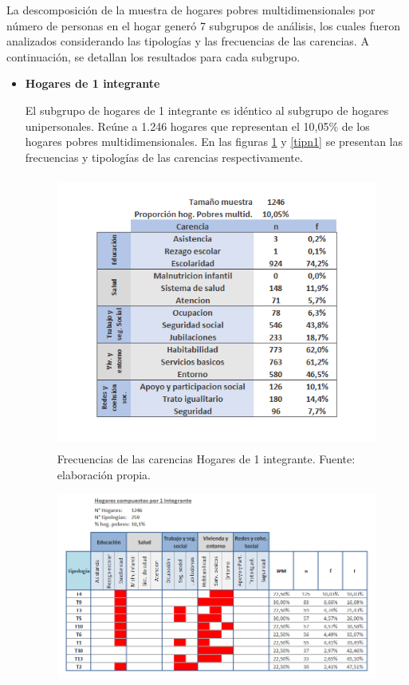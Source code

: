 \documentclass[12pt,letterpaper,spanish]{article}
\begin{document}
La descomposición de la muestra de hogares pobres multidimensionales por número de personas en el hogar generó 7 subgrupos de análisis, los cuales fueron analizados considerando las tipologías y las frecuencias de las carencias. A continuación, se detallan los resultados para cada subgrupo.
\begin{itemize}
    \item \textbf{Hogares de 1 integrante}

    El subgrupo de hogares de 1 integrante es idéntico al subgrupo de hogares unipersonales. Reúne a 1.246 hogares que representan el 10,05\% de los hogares pobres multidimensionales. En las figuras \ref{fren1} y \ref{tipn1} se presentan las frecuencias y tipologías de las carencias respectivamente. 

    \begin{figure}[H]
        \centering 
        \includegraphics[height=9cm]{HOGARES/tabla_unip.png}
        \caption{Frecuencias de las carencias Hogares de 1 integrante. Fuente: elaboración propia.}
        \label{fren1}
    \end{figure}
    \begin{figure}[H]
        \centering
        \includegraphics[width=\textwidth]{Mati N/n=1.png}

\end{figure}
\end{itemize}
\end{document}
